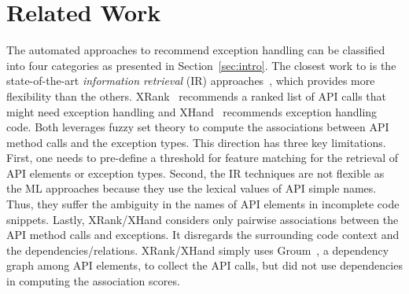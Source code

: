 \section{Related Work}
\label{sec:related}

The automated approaches to recommend exception handling can be
classified into four categories as presented in Section~\ref{sec:intro}.
The closest work to {\tool} is the state-of-the-art {\em information
  retrieval} (IR) approaches~\cite{xrank-fse20}, which provides more
flexibility than the others. XRank~\cite{xrank-fse20} recommends a
ranked list of API calls that might need exception handling and
XHand~\cite{xrank-fse20} recommends exception handling code. Both
leverages fuzzy set theory to compute the associations between API
method calls and the exception types. This direction has three key
limitations. First, one needs to pre-define a threshold for feature
matching for the retrieval of API elements or exception types. Second,
the IR techniques are not flexible as the ML approaches because they
use the lexical values of API simple names. Thus, they suffer the
ambiguity in the names of API elements in incomplete code
snippets. Lastly, XRank/XHand considers only pairwise associations
between the API method calls and exceptions. It disregards the
surrounding code context and the dependencies/relations. XRank/XHand
simply uses Groum~\cite{fse09}, a dependency graph among API elements,
to collect the API calls, but did not use dependencies in
computing the association scores.

